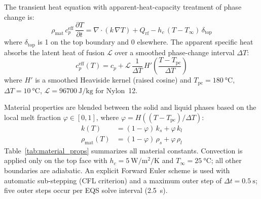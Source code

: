 \documentclass[5p,times]{elsarticle}
\newcommand{\Qrf}{Q_{\mathrm{rf}}}
\newcommand{\Tpc}{T_{\mathrm{pc}}}
\newcommand{\phimelt}{\varphi}
\begin{document}
The transient heat equation with apparent-heat-capacity treatment of
phase change is:
\begin{equation}
  \rho_{\mathrm{mat}}\,c_p^{\mathrm{eff}}\,\frac{\partial T}{\partial t}
  = \nabla\cdot(k\,\nabla T) + \Qrf - h_c\,(T - T_\infty)\,\delta_{\mathrm{top}}
  \label{eq:heat_eqn}
\end{equation}
where $\delta_{\mathrm{top}}$ is 1 on the top boundary and 0
elsewhere.  The apparent specific heat absorbs the latent heat of
fusion $\mathcal{L}$ over a smoothed phase-change interval $\Delta T$:
\begin{equation}
  c_p^{\mathrm{eff}}(T) = c_p + \mathcal{L}\,
  \frac{1}{\Delta T}\,H'\!\left(\frac{T - \Tpc}{\Delta T}\right)
  \label{eq:apparent_cp}
\end{equation}
where $H'$ is a smoothed Heaviside kernel (raised cosine) and
$\Tpc = \SI{180}{\celsius}$, $\Delta T = \SI{10}{\celsius}$,
$\mathcal{L} = \SI{96700}{\joule\per\kilogram}$ for Nylon~12.

Material properties are blended between the solid and liquid phases
based on the local melt fraction $\phimelt \in [0, 1]$, where
$\phimelt = H((T - \Tpc)/\Delta T)$:
\begin{align}
  k(T) &= (1-\phimelt)\,k_s + \phimelt\,k_l \\
  \rho_{\mathrm{mat}}(T) &= (1-\phimelt)\,\rho_s + \phimelt\,\rho_l
\end{align}
Table~\ref{tab:material_props} summarizes all material constants.
Convection is applied only on the top face with $h_c =
\SI{5}{\watt\per\meter\squared\per\kelvin}$ and $T_\infty =
\SI{25}{\celsius}$; all other boundaries are adiabatic.  An explicit Forward Euler scheme is used with automatic sub-stepping
(CFL criterion) and a maximum outer step of $\Delta t = \SI{0.5}{\second}$;
five outer steps occur per EQS solve interval (\SI{2.5}{\second}).
\end{document}
